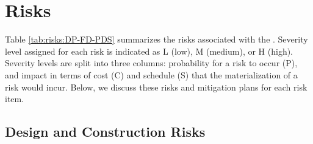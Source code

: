 \section{Risks}
\label{sec:dp-pds-risks}

Table%
\ref{tab:risks:DP-FD-PDS} summarizes the risks associated with the  . Severity level assigned for each risk is indicated as L (low), M (medium), or H (high). Severity levels are split into three columns: probability for a risk to occur (P), and impact in terms of cost (C) and schedule (S) that the materialization of a risk would incur. Below, we discuss these risks and mitigation plans for each risk item.




\subsection{Design and Construction Risks}
\label{sec:dp-pds-risks_design}

